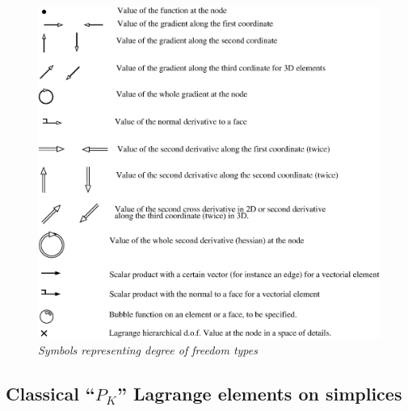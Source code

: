 \documentclass[10pt,a4paper]{article}
\begin{document}
\begin{figure}[H] \label{fig:symbols}
  \begin{center}
    \includegraphics[width=15cm,angle=0]{getfemlist_symbols.eps}
  \end{center}
  \caption{ \it Symbols representing degree of freedom types}
\end{figure}


\subsection{Classical ``$P_K$'' Lagrange elements on simplices}
\end{document}
